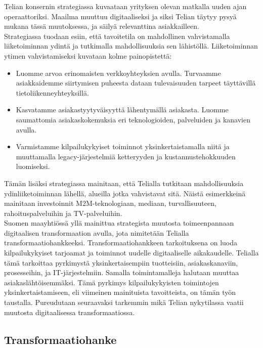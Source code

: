 \documentclass[finnish,12pt,a4paper,pdftex]{article}
\begin{document}
Telian konsernin strategiassa \citeyearpar{telia} kuvaataan yrityksen olevan matkalla uuden ajan operaattoriksi. Maailma muuttuu digitaaliseksi ja siksi Telian täytyy pysyä mukana tässä muutoksessa, ja säilyä relevanttina asiakkailleen.  \\

\noindent Strategiassa tuodaan esiin, että tavoitetila on mahdollinen vahvistamalla liiketoiminnan ydintä ja tutkimalla mahdollisuuksia sen lähistöllä. Liiketoiminnan ytimen vahvistamiseksi kuvataan kolme painopistettä:
\begin{itemize}
    \item Luomme arvoa erinomaisten verkkoyhteyksien avulla. Turvaamme asiakkaidemme siirtymisen puheesta dataan tulevaisuuden tarpeet täyttävillä tietoliikenneyhteyksillä.
    \item Kasvatamme asiakastyytyväisyyttä lähentymällä asiakasta. Luomme saumattomia asiakaskokemuksia eri teknologioiden, palveluiden ja kanavien avulla.
    \item Varmistamme kilpailukykyiset toiminnot yksinkertaistamalla niitä ja muuttamalla legacy-järjestelmiä ketteryyden ja kustannustehokkuuden luomiseksi.
\end{itemize}

\noindent Tämän lisäksi strategiassa mainitaan, että Telialla tutkitaan mahdollisuuksia ydinliiketoiminnan lähellä, alueilla jotka vahvistavat sitä. Näistä esimerkkeinä mainitaan investoinnit M2M-teknologiaan, mediaan, turvallisuuteen, rahoituspalveluihin ja TV-palveluihin.\\

\noindent  Suomen maayhtiössä yllä mainittua strategista muutosta toimeenpannaan digitaalisen transformaation avulla, jota nimitetään Telialla transformaatiohankkeeksi. Transformaatiohankkeen tarkoituksena on luoda kilpailukykyiset tarjoamat ja toiminnot uudelle digitaaliselle aikakaudelle. Telialla tämä tarkoittaa pyrkimystä yksinkertaisempiin tuotteisiin, asiakaskanaviin, prosesseihin, ja IT-järjestelmiin. Samalla toimintamalleja halutaan muuttaa asiakaslähtöisemmäksi. Tämä pyrkimys kilpailukykyisten toimintojen yksinkertaistamiseen, eli viimeinen mainituista tavoitteista, on tämän työn taustalla. Pureudutaan seuraavaksi tarkemmin mikä Telian nykytilassa vaatii muutosta digitaalisessa transformaatiossa.

\subsection{Transformaatiohanke}
\end{document}
